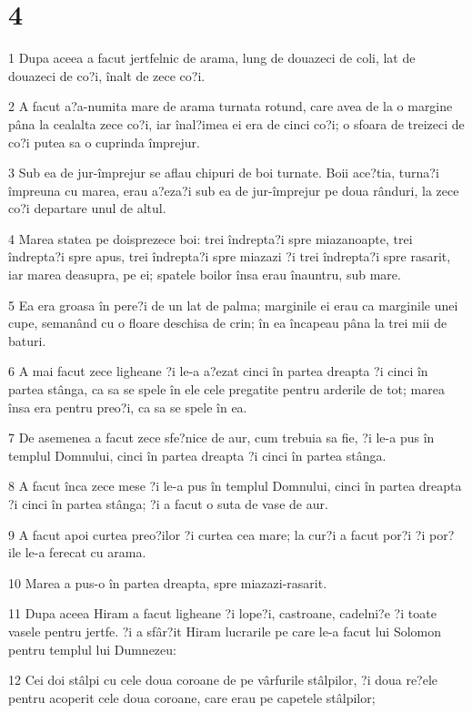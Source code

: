 \chapter{4}

\par 1 Dupa aceea a facut jertfelnic de arama, lung de douazeci de coli, lat de douazeci de co?i, înalt de zece co?i.
\par 2 A facut a?a-numita mare de arama turnata rotund, care avea de la o margine pâna la cealalta zece co?i, iar înal?imea ei era de cinci co?i; o sfoara de treizeci de co?i putea sa o cuprinda împrejur.
\par 3 Sub ea de jur-împrejur se aflau chipuri de boi turnate. Boii ace?tia, turna?i împreuna cu marea, erau a?eza?i sub ea de jur-împrejur pe doua rânduri, la zece co?i departare unul de altul.
\par 4 Marea statea pe doisprezece boi: trei îndrepta?i spre miazanoapte, trei îndrepta?i spre apus, trei îndrepta?i spre miazazi ?i trei îndrepta?i spre rasarit, iar marea deasupra, pe ei; spatele boilor însa erau înauntru, sub mare.
\par 5 Ea era groasa în pere?i de un lat de palma; marginile ei erau ca marginile unei cupe, semanând cu o floare deschisa de crin; în ea încapeau pâna la trei mii de baturi.
\par 6 A mai facut zece ligheane ?i le-a a?ezat cinci în partea dreapta ?i cinci în partea stânga, ca sa se spele în ele cele pregatite pentru arderile de tot; marea însa era pentru preo?i, ca sa se spele în ea.
\par 7 De asemenea a facut zece sfe?nice de aur, cum trebuia sa fie, ?i le-a pus în templul Domnului, cinci în partea dreapta ?i cinci în partea stânga.
\par 8 A facut înca zece mese ?i le-a pus în templul Domnului, cinci în partea dreapta ?i cinci în partea stânga; ?i a facut o suta de vase de aur.
\par 9 A facut apoi curtea preo?ilor ?i curtea cea mare; la cur?i a facut por?i ?i por?ile le-a ferecat cu arama.
\par 10 Marea a pus-o în partea dreapta, spre miazazi-rasarit.
\par 11 Dupa aceea Hiram a facut ligheane ?i lope?i, castroane, cadelni?e ?i toate vasele pentru jertfe. ?i a sfâr?it Hiram lucrarile pe care le-a facut lui Solomon pentru templul lui Dumnezeu:
\par 12 Cei doi stâlpi cu cele doua coroane de pe vârfurile stâlpilor, ?i doua re?ele pentru acoperit cele doua coroane, care erau pe capetele stâlpilor;
